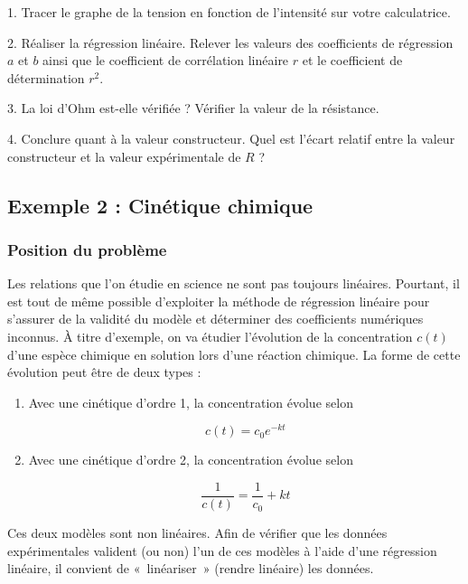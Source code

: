 \documentclass[a4paper, 12pt, final, garamond]{book}
\begin{document}
1. Tracer le graphe de la tension en fonction de l'intensité sur votre
calculatrice. 

\medskip

2. Réaliser la régression linéaire. Relever les valeurs des coefficients de
régression $a$ et $b$ ainsi que le coefficient de corrélation linéaire
$r$ et le coefficient de détermination $r^2$.

\vspace{2cm}

3. La loi d'Ohm est-elle vérifiée ? Vérifier la valeur de la résistance. 

\vspace{3cm}

4. Conclure quant à la valeur constructeur. Quel est l'écart relatif entre la
valeur constructeur et la valeur expérimentale de $R$ ?

\vspace{3cm}


\subsection{Exemple 2 : Cinétique chimique}

\subsubsection{Position du problème}

Les relations que l'on étudie en science ne sont pas toujours linéaires.
Pourtant, il est tout de même possible d'exploiter la méthode de
régression linéaire pour s'assurer de la validité du modèle et
déterminer des coefficients numériques inconnus. À titre d'exemple, on va
étudier l'évolution de la concentration $c(t)$ d'une espèce chimique en
solution lors d'une réaction chimique. La forme de cette évolution peut
être de deux types :

\begin{enumerate}
\item Avec une cinétique d'ordre 1, la concentration évolue selon

\[c(t) = c_0 e^{-kt}\]

\item Avec une cinétique d'ordre 2, la concentration évolue selon

\[\frac{1}{c(t)} = \frac{1}{c_0} + kt\]
\end{enumerate}

Ces deux modèles sont non linéaires. Afin de vérifier que les
données expérimentales valident (ou non) l'un de ces modèles à
l'aide d'une régression linéaire, il convient de «~linéariser~»
(rendre linéaire) les données. 
\end{document}
